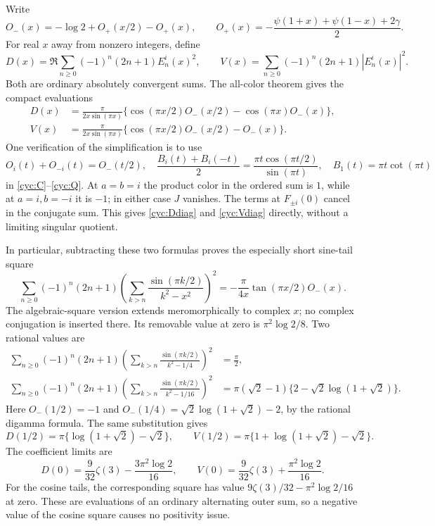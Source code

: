 Write
\[
 O_-(x)=-\log2+O_+(x/2)-O_+(x),\qquad
 O_+(x)=-\frac{\psi(1+x)+\psi(1-x)+2\gamma}{2}.
\]
For real $x$ away from nonzero integers, define
\[
 D(x)=\Re\sum_{n\ge0}(-1)^n(2n+1)E_n^i(x)^2,\qquad
 V(x)=\sum_{n\ge0}(-1)^n(2n+1)|E_n^i(x)|^2.
\]
Both are ordinary absolutely convergent sums.  The all-color theorem
gives the compact evaluations
\begin{align}
 D(x)&=\frac{\pi}{2x\sin(\pi x)}
   \{\cos(\pi x/2)O_-(x/2)-\cos(\pi x)O_-(x)\},
 \label{cyc:Ddiag}\\
 V(x)&=\frac{\pi}{2x\sin(\pi x)}
   \{\cos(\pi x/2)O_-(x/2)-O_-(x)\}.
 \label{cyc:Vdiag}
\end{align}
One verification of the simplification is to use
\[
 O_i(t)+O_{-i}(t)=O_-(t/2),\quad
 \frac{B_i(t)+B_i(-t)}2
       =\frac{\pi t\cos(\pi t/2)}{\sin(\pi t)},
 \quad B_1(t)=\pi t\cot(\pi t)
\]
in \eqref{cyc:C}--\eqref{cyc:Q}.  At $a=b=i$ the product color in
the ordered sum is $1$, while at $a=i,b=-i$ it is $-1$;
in either case $J$ vanishes.  The terms at $F_{\pm i}(0)$ cancel
in the conjugate sum.  This gives \eqref{cyc:Ddiag} and
\eqref{cyc:Vdiag} directly, without a limiting singular quotient.

In particular, subtracting these two formulas proves the especially
short sine-tail square
\begin{equation}\label{cyc:sinesquare}
 \boxed{\displaystyle
 \sum_{n\ge0}(-1)^n(2n+1)
  \left(\sum_{k>n}\frac{\sin(\pi k/2)}{k^2-x^2}\right)^2
       =-\frac{\pi}{4x}\tan(\pi x/2)O_-(x).}
\end{equation}
The algebraic-square version extends meromorphically to complex $x$;
no complex conjugation is inserted there.  Its removable value at
zero is $\pi^2\log2/8$.  Two rational values are
\begin{align}
 \sum_{n\ge0}(-1)^n(2n+1)
  \left(\sum_{k>n}\frac{\sin(\pi k/2)}{k^2-1/4}\right)^2
       &=\frac\pi2,\label{cyc:sinehalf}\\
 \sum_{n\ge0}(-1)^n(2n+1)
  \left(\sum_{k>n}\frac{\sin(\pi k/2)}{k^2-1/16}\right)^2
       &=\pi(\sqrt2-1)
                 \{2-\sqrt2\log(1+\sqrt2)\}.
 \label{cyc:sinequarter}
\end{align}
Here $O_-(1/2)=-1$ and
$O_-(1/4)=\sqrt2\log(1+\sqrt2)-2$, by the rational digamma
formula.  The same substitution gives
\[
 D(1/2)=\pi\{\log(1+\sqrt2)-\sqrt2\},\qquad
 V(1/2)=\pi\{1+\log(1+\sqrt2)-\sqrt2\}.
\]
The coefficient limits are
\[
 D(0)=\frac9{32}\zeta(3)-\frac{3\pi^2\log2}{16},\qquad
 V(0)=\frac9{32}\zeta(3)+\frac{\pi^2\log2}{16}.
\]
For the cosine tails, the corresponding square has value
$9\zeta(3)/32-\pi^2\log2/16$ at zero.  These are evaluations
of an ordinary alternating outer sum, so a negative value of the
cosine square causes no positivity issue.

